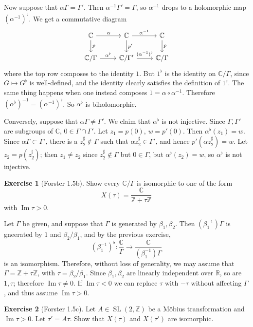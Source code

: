 \documentclass[10pt]{article}
\newcommand{\ZZ}{\mathbb{Z}}
\newcommand{\RR}{\mathbb{R}}
\newcommand{\CC}{\mathbb{C}}
\newcommand{\SL}{\operatorname{SL}}
\renewcommand{\Im}{\operatorname{Im}}
\theoremstyle{definition}
\newtheorem{exer}{Exercise}
\begin{document}
Now suppose that $\alpha \Gamma = \Gamma'$.
Then $\alpha^{-1} \Gamma' = \Gamma$, so $\alpha^{-1}$ drops to a holomorphic map $(\alpha^{-1})^\flat$.
We get a commutative diagram
$$\begin{tikzcd}
\CC \arrow[r,"\alpha"] \arrow[d,"p"] & \CC \arrow[r,"\alpha^{-1}"] \arrow[d,"p'"] & \CC \arrow[d,"p"]\\
\CC/\Gamma \arrow[r,"\alpha^\flat"] & \CC/\Gamma' \arrow[r,"(\alpha^{-1})^\flat"] & \CC/\Gamma
\end{tikzcd}$$
where the top row composes to the identity $1$. But $1^\flat$ is the identity on $\CC/\Gamma$, since $G \mapsto G^\flat$ is well-defined, and the identity clearly satisfies the definition of $1^\flat$.
The same thing happens when one instead composes $1 = \alpha \circ \alpha^{-1}$.
Therefore $(\alpha^\flat)^{-1} = (\alpha^{-1})^\flat$.
So $\alpha^\flat$ is biholomorphic.

Conversely, suppose that $\alpha \Gamma \neq \Gamma'$.
We claim that $\alpha^\flat$ is not injective.
Since $\Gamma, \Gamma'$ are subgroups of $\CC$, $0 \in \Gamma \cap \Gamma'$.
Let $z_1 = p(0)$, $w = p'(0)$. Then $\alpha^\flat(z_1) = w$.
Since $\alpha \Gamma \subset \Gamma'$, there is a $z_2^\sharp \notin \Gamma$ such that $\alpha z_2^\sharp \in \Gamma'$, and hence $p'(\alpha z_2^\sharp) = w$.
Let $z_2 = p(z_2^\sharp)$; then $z_1 \neq z_2$ since $z_2^\sharp \notin \Gamma$ but $0 \in \Gamma$, but $\alpha^\flat(z_2) = w$, so $\alpha^\flat$ is not injective.

\begin{exer}[Forster 1.5b]
Show every $\CC/\Gamma$ is isomorphic to one of the form
$$X(\tau) = \frac{\CC}{\ZZ + \tau \ZZ}$$
with $\Im \tau > 0$.
\end{exer}

Let $\Gamma$ be given, and suppose that $\Gamma$ is generated by $\beta_1, \beta_2$.
Then $(\beta_1^{-1})\Gamma$ is gneerated by $1$ and $\beta_2/\beta_1$, and by the previous exercise,
$$(\beta_1^{-1})^\flat: \frac{\CC}{\Gamma} \to \frac{\CC}{(\beta_1^{-1})\Gamma}$$
is an isomorphism. Therefore, without loss of generality, we may assume that $\Gamma = \ZZ + \tau\ZZ$, with $\tau = \beta_2/\beta_1$.
Since $\beta_1,\beta_2$ are linearly independent over $\RR$, so are $1,\tau$; therefore $\Im \tau \neq 0$.
If $\Im \tau < 0$ we can replace $\tau$ with $-\tau$ without affecting $\Gamma$, and thus assume $\Im \tau > 0$.

\begin{exer}[Forster 1.5c]
Let $A \in \SL(2, \ZZ)$ be a M\"obius transformation and $\Im \tau > 0$. Let $\tau' = A\tau$. Show that $X(\tau)$ and $X(\tau')$ are isomorphic.
\end{exer}
\end{document}
